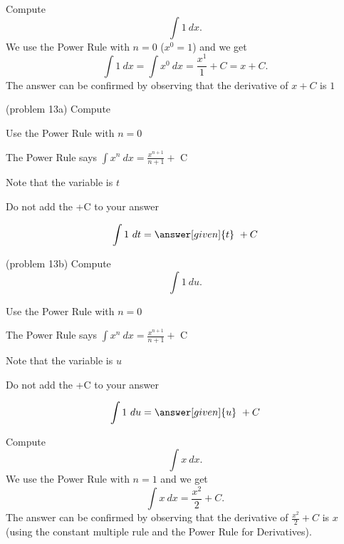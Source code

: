 \documentclass{ximera}
\begin{document}
\begin{example}[example 13]
Compute $$\int 1 \ dx.$$
We use the Power Rule with $n= 0$  ($x^0 = 1$) and we get
\[\int 1 \ dx = \int x^0 \ dx =\frac{x^1}{1} + C = x+C.\] The answer can be confirmed by observing that the 
derivative of $x + C$ is $1$ 
\end{example}

\begin{problem}(problem 13a)
Compute 


\begin{hint}
Use the Power Rule with $n=0$
\end{hint}
\begin{hint}
The Power Rule says $\int x^n \ dx = \frac{x^{n+1}}{n+1} +$ C
\end{hint}
\begin{hint}
Note that the variable is $t$
\end{hint}
\begin{hint}
\begin{center}
Do not add the +C to your answer
\end{center}
\end{hint}

\[
\int 1 \ dt =
\answer[given]{t} \ + C
\]
\end{problem}


\begin{problem}(problem 13b)
Compute 
\[
\int 1 \ du.
\]


\begin{hint}
Use the Power Rule with $n=0$
\end{hint}
\begin{hint}
The Power Rule says $\int x^n \ dx = \frac{x^{n+1}}{n+1} +$ C
\end{hint}
\begin{hint}
Note that the variable is $u$
\end{hint}
\begin{hint}
\begin{center}
Do not add the +C to your answer
\end{center}
\end{hint}

\[
\int 1 \ du =
\answer[given]{u} \ + C
\]
\end{problem}


\begin{example}[example 14]
Compute $$\int x \ dx.$$
We use the Power Rule with $n= 1$ and we get
\[\int x \ dx = \frac{x^2}{2} + C.\] The answer can be confirmed by observing that the 
derivative of $\frac{x^2}{2} +C$ is $x$ (using the constant multiple rule and the Power Rule for Derivatives).
\end{example}
\end{document}
